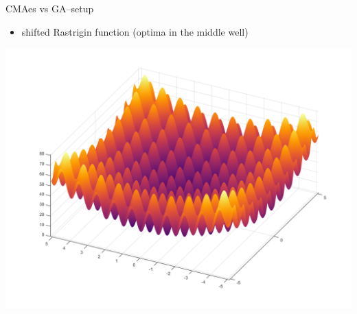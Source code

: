\documentclass[presentation]{beamer}
\begin{document}
\begin{frame}[label={sec:orga26448e}]{CMAes vs GA--setup}
\begin{itemize}
\item shifted Rastrigin function (optima in the middle well)
\end{itemize}
\begin{center}
\includegraphics[width=.9\linewidth]{images/rastrigin.png}
\end{center}
\end{frame}
\end{document}
